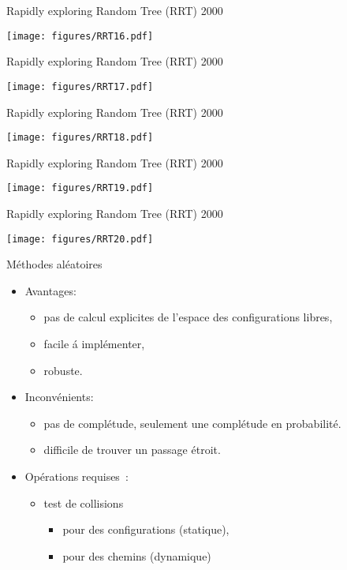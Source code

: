 \begin{frame} {Rapidly exploring Random Tree (RRT) 2000}
\centerline {
  \texttt{[image: figures/RRT16.pdf]}
}
\end{frame}

\begin{frame} {Rapidly exploring Random Tree (RRT) 2000}
\centerline {
  \texttt{[image: figures/RRT17.pdf]}
}
\end{frame}

\begin{frame} {Rapidly exploring Random Tree (RRT) 2000}
\centerline {
  \texttt{[image: figures/RRT18.pdf]}
}
\end{frame}

\begin{frame} {Rapidly exploring Random Tree (RRT) 2000}
\centerline {
  \texttt{[image: figures/RRT19.pdf]}
}
\end{frame}

\begin{frame} {Rapidly exploring Random Tree (RRT) 2000}
\centerline {
  \texttt{[image: figures/RRT20.pdf]}
}
\end{frame}

%
%

\begin{frame} {M\'ethodes al\'eatoires}
  \begin{itemize}
  \item Avantages:
    \begin{itemize}
    \item pas de calcul explicites de l'espace des configurations libres,
    \item facile \'a impl\'ementer,
    \item robuste.
    \end{itemize}
    \pause
  \item Inconv\'enients:
    \begin{itemize}
    \item pas de compl\'etude, seulement une compl\'etude en probabilit\'e.
    \item difficile de trouver un passage \'etroit.
    \end{itemize}
    \pause
  \item Op\'erations requises~:
    \begin{itemize}
    \item test de collisions
      \begin{itemize}
      \item pour des configurations (statique),
      \item pour des chemins (dynamique)
      \end{itemize}
    \end{itemize}
  \end{itemize}
\end{frame}
